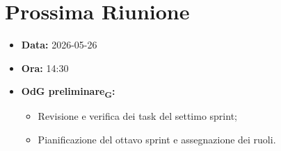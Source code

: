 \section{Prossima Riunione}
\begin{itemize}
	\item \textbf{Data:} 2026-05-26
	\item \textbf{Ora:} 14:30
	\item \textbf{OdG preliminare\textsubscript{G}:}
	\begin{itemize}
		\item Revisione e verifica dei task del settimo sprint;
		\item Pianificazione del ottavo sprint e assegnazione dei ruoli.
	\end{itemize}
\end{itemize}
